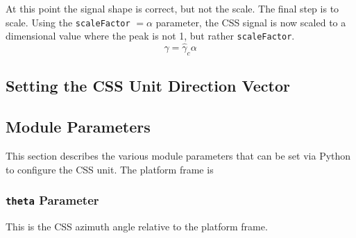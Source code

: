 \documentclass[]{BasiliskReportMemo}
\begin{document}
At this point the signal shape is correct, but not the scale.  The final step is to scale.  Using the {\tt scaleFactor} $=\alpha$ parameter, the CSS signal is now scaled to a dimensional value where the peak is not 1, but rather {\tt scaleFactor}.  
\begin{equation}
	\gamma = \hat{\gamma}_{c} \alpha
\end{equation}





\subsection{Setting the CSS Unit Direction Vector}



\subsection{Module Parameters}
This section describes the various module parameters that can be set via Python to configure the CSS unit.  The platform frame is 

\subsubsection{{\tt theta} Parameter}
This is the CSS azimuth angle relative to the platform frame.
\end{document}
